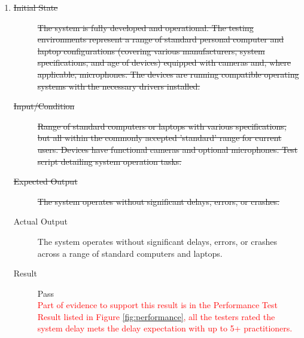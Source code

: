 \documentclass[12pt, titlepage]{article}
\newcommand{\rt}[1]{\textcolor{red}{#1}}
\begin{document}
\begin{enumerate}
\item \label{NFRT18}
  \begin{description}
  \item[\sout{Initial State}] \sout{The system is fully developed and
      operational. The testing environments represent a range of standard
      personal computer and laptop configurations (covering various
      manufacturers, system specifications, and age of devices) equipped
      with cameras and, where applicable, microphones. The devices are
      running compatible operating systems with the necessary drivers
      installed.}
  \item[\sout{Input/Condition}] \sout{Range of standard computers or laptops
      with various specifications, but all within the commonly accepted
      'standard' range for current users. Devices have functional cameras
      and optional microphones. Test script detailing system operation
      tasks.}
  \item[\sout{Expected Output}] \sout{The system operates without significant
      delays, errors, or crashes.}
  \item[Actual Output] The system operates without significant delays, errors, or
    crashes across a range of standard computers and laptops.
  \item[Result] Pass \\
  \rt{Part of evidence to support this result is in the Performance Test Result listed in Figure \ref{fig:performance},
  all the testers rated the system delay mets the delay expectation with up to 5+ practitioners.}
  \end{description}
\end{enumerate}
\end{document}
